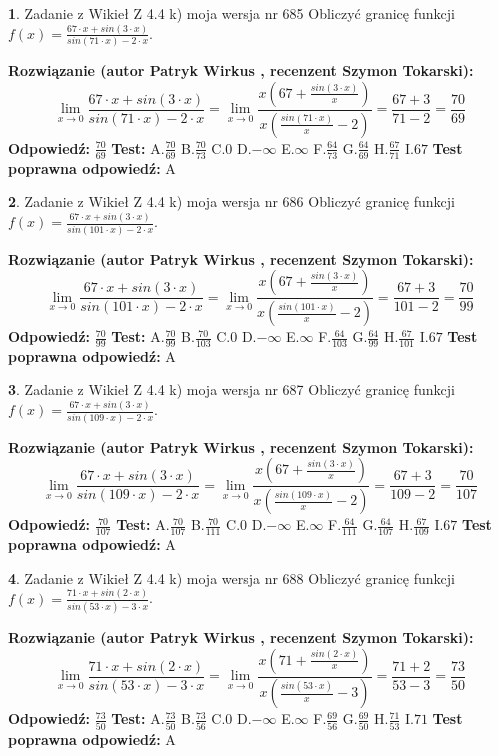 \documentclass[12pt, a4paper]{article}
\theoremstyle{definition} %
\newtheorem{zad}{}
\newcommand{\zadStart}[1]{\begin{zad}#1\newline}
\newcommand{\zadStop}{\end{zad}}
\newcommand{\rozwStart}[2]{\noindent \textbf{Rozwiązanie (autor #1 , recenzent #2): }\newline}
\newcommand{\rozwStop}{\newline}
\newcommand{\odpStart}{\noindent \textbf{Odpowiedź:}\newline}
\newcommand{\odpStop}{\newline}
\newcommand{\testStart}{\noindent \textbf{Test:}\newline}
\newcommand{\testStop}{\newline}
\newcommand{\kluczStart}{\noindent \textbf{Test poprawna odpowiedź:}\newline}
\newcommand{\kluczStop}{\newline}
\begin{document}
\zadStart{Zadanie z Wikieł Z 4.4 k) moja wersja nr 685}
Obliczyć granicę funkcji $f(x)=\frac{67\cdot x +sin(3\cdot x)}{sin(71\cdot x) -2\cdot x}$.
\zadStop
\rozwStart{Patryk Wirkus}{Szymon Tokarski}
$$\lim\limits_{x\to 0}\frac{67\cdot x +sin(3\cdot x)}{sin(71\cdot x) -2\cdot x}
=\lim\limits_{x\to 0}\frac{x(67+\frac{sin(3\cdot x)}{x})}{x(\frac{sin(71\cdot x)}{x}-2)}
=\frac{67+3}{71-2} = \frac{70}{69}$$
\rozwStop
\odpStart
$\frac{70}{69}$
\odpStop
\testStart
A.$\frac{70}{69}$
B.$\frac{70}{73}$
C.$0$
D.$-\infty$
E.$\infty$
F.$\frac{64}{73}$
G.$\frac{64}{69}$
H.$\frac{67}{71}$
I.$67$
\testStop
\kluczStart
A
\kluczStop



\zadStart{Zadanie z Wikieł Z 4.4 k) moja wersja nr 686}
Obliczyć granicę funkcji $f(x)=\frac{67\cdot x +sin(3\cdot x)}{sin(101\cdot x) -2\cdot x}$.
\zadStop
\rozwStart{Patryk Wirkus}{Szymon Tokarski}
$$\lim\limits_{x\to 0}\frac{67\cdot x +sin(3\cdot x)}{sin(101\cdot x) -2\cdot x}
=\lim\limits_{x\to 0}\frac{x(67+\frac{sin(3\cdot x)}{x})}{x(\frac{sin(101\cdot x)}{x}-2)}
=\frac{67+3}{101-2} = \frac{70}{99}$$
\rozwStop
\odpStart
$\frac{70}{99}$
\odpStop
\testStart
A.$\frac{70}{99}$
B.$\frac{70}{103}$
C.$0$
D.$-\infty$
E.$\infty$
F.$\frac{64}{103}$
G.$\frac{64}{99}$
H.$\frac{67}{101}$
I.$67$
\testStop
\kluczStart
A
\kluczStop



\zadStart{Zadanie z Wikieł Z 4.4 k) moja wersja nr 687}
Obliczyć granicę funkcji $f(x)=\frac{67\cdot x +sin(3\cdot x)}{sin(109\cdot x) -2\cdot x}$.
\zadStop
\rozwStart{Patryk Wirkus}{Szymon Tokarski}
$$\lim\limits_{x\to 0}\frac{67\cdot x +sin(3\cdot x)}{sin(109\cdot x) -2\cdot x}
=\lim\limits_{x\to 0}\frac{x(67+\frac{sin(3\cdot x)}{x})}{x(\frac{sin(109\cdot x)}{x}-2)}
=\frac{67+3}{109-2} = \frac{70}{107}$$
\rozwStop
\odpStart
$\frac{70}{107}$
\odpStop
\testStart
A.$\frac{70}{107}$
B.$\frac{70}{111}$
C.$0$
D.$-\infty$
E.$\infty$
F.$\frac{64}{111}$
G.$\frac{64}{107}$
H.$\frac{67}{109}$
I.$67$
\testStop
\kluczStart
A
\kluczStop



\zadStart{Zadanie z Wikieł Z 4.4 k) moja wersja nr 688}
Obliczyć granicę funkcji $f(x)=\frac{71\cdot x +sin(2\cdot x)}{sin(53\cdot x) -3\cdot x}$.
\zadStop
\rozwStart{Patryk Wirkus}{Szymon Tokarski}
$$\lim\limits_{x\to 0}\frac{71\cdot x +sin(2\cdot x)}{sin(53\cdot x) -3\cdot x}
=\lim\limits_{x\to 0}\frac{x(71+\frac{sin(2\cdot x)}{x})}{x(\frac{sin(53\cdot x)}{x}-3)}
=\frac{71+2}{53-3} = \frac{73}{50}$$
\rozwStop
\odpStart
$\frac{73}{50}$
\odpStop
\testStart
A.$\frac{73}{50}$
B.$\frac{73}{56}$
C.$0$
D.$-\infty$
E.$\infty$
F.$\frac{69}{56}$
G.$\frac{69}{50}$
H.$\frac{71}{53}$
I.$71$
\testStop
\kluczStart
A
\kluczStop
\end{document}
